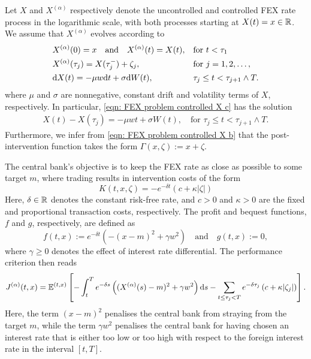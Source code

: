 Let $X$ and $X^{(\alpha)}$ respectively denote the uncontrolled and controlled FEX rate process in the logarithmic scale, with both processes starting at $X(t)=x \in \mathbb{R}$. We assume that $X^{(\alpha)}$ evolves according to
\begin{subequations}
\label{eqn: FEX problem controlled X}
\begin{align}
    & X^{(\alpha)}(0)= x \quad \text{and} \quad X^{(\alpha)}(t)=X(t), && \text{for } t < \tau_1 \label{eqn: FEX problem controlled X a} \\*
    & X^{(\alpha)}(\tau_j) = X(\tau_j^-) + \zeta_j, && \text{for } j = 1, 2, \ldots, \label{eqn: FEX problem controlled X b} \\*
    & \mathrm{d} X(t) = -\mu w \mathrm{d} t + \sigma \mathrm{d} W(t), && \tau_j \leq t < \tau_{j+1} \wedge T.
    \label{eqn: FEX problem controlled X c}
\end{align}
\end{subequations}
where $\mu$ and $\sigma$ are nonnegative, constant drift and volatility terms of $X$, respectively. In particular, \eqref{eqn: FEX problem controlled X c} has the solution
\begin{align}
    X(t) - X(\tau_j) = -\mu w t + \sigma W(t), \quad \text{for } \tau_j \leq t < \tau_{j+1} \wedge T.
    \label{eqn: FEX uncontrolled solution}
\end{align}
Furthermore, we infer from \eqref{eqn: FEX problem controlled X b} that the post-intervention function takes the form $\Gamma(x,\zeta) := x + \zeta$.

The central bank's objective is to keep the FEX rate as close as possible to some target $m$, where trading results in intervention costs of the form
\begin{equation}
    K(t,x,\zeta) = -e^{-\delta t}(c + \kappa |\zeta|) 
    \label{eqn: FEX transaction costs}
\end{equation}
Here, $\delta \in \mathbb{R}$ denotes the constant risk-free rate, and $c>0$ and $\kappa>0$ are the fixed and proportional transaction costs, respectively. The profit and bequest functions, $f$ and $g$, respectively, are defined as
\begin{equation*}
    f(t,x) := e^{-\delta t} \left( -(x-m)^2 + \gamma w^2 \right) \quad \text{and} \quad g(t,x) := 0,
\end{equation*}
where $\gamma\geq 0$ denotes the effect of interest rate differential. The performance criterion then reads
\begin{equation}
    J^{(\alpha)}(t,x) = \mathbb{E}^{(t,x)}\left[ - \int_t^T e^{-\delta s} \left( (X^{(\alpha)}(s) - m)^2 + \gamma w^2 \right) \mathrm{d} s - \sum_{t \leq \tau_j < T} e^{-\delta \tau_j} \left( c + \kappa |\zeta_j| \right) \right]. 
    \label{eqn: performance criterion FEX example}
\end{equation}
Here, the term $(x-m)^2$ penalises the central bank from straying from the target $m$, while the term $\gamma w^2$ penalises the central bank for having chosen an interest rate that is either too low or too high with respect to the foreign interest rate in the interval $[t,T]$. 

